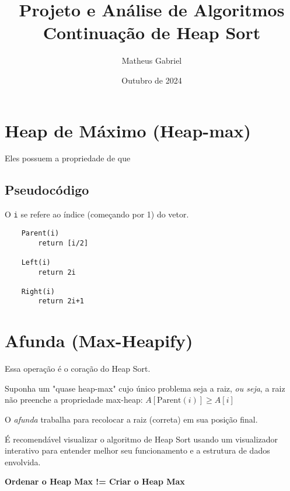 \documentclass{article}
\title{Projeto e Análise de Algoritmos \\
\large Continuação de Heap Sort}
\author{Matheus Gabriel}
\date{Outubro de 2024}
\begin{document}
\maketitle

\section{Heap de Máximo (Heap-max)}

Eles possuem a propriedade de que \textbf{}

\subsection{Pseudocódigo}

O \texttt{i} se refere ao índice (começando por 1) do vetor.

\begin{verbatim}
    Parent(i)
        return [i/2]

    Left(i)
        return 2i

    Right(i)
        return 2i+1
\end{verbatim}

\section{Afunda (Max-Heapify)}

Essa operação é o coração do Heap Sort.

Suponha um "quase heap-max" cujo único problema seja a raiz, \textit{ou seja}, a raiz não preenche a propriedade max-heap: $A[\text{Parent}(i)] \geq A[i]$

O \textit{afunda} trabalha para recolocar a raiz (correta) em sua posição final.


\begin{tcolorbox}[colback=yellow!10!white, colframe=orange!80!black, title=Aviso]
    É recomendável visualizar o algoritmo de Heap Sort usando um visualizador interativo para entender melhor seu funcionamento e a estrutura de dados envolvida.
\end{tcolorbox}

\textbf{Ordenar o Heap Max != Criar o Heap Max}
\end{document}
